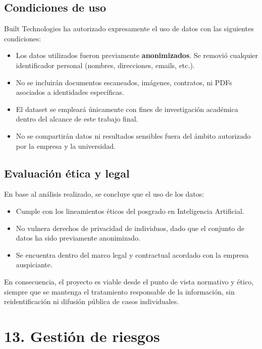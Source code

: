 \documentclass[
11pt, %
]{charter}
\begin{document}
\subsection*{Condiciones de uso}

Built Technologies ha autorizado expresamente el uso de datos con las siguientes condiciones:

\begin{itemize}
    \item Los datos utilizados fueron previamente \textbf{anonimizados}. Se removió cualquier identificador personal (nombres, direcciones, emails, etc.).
    \item No se incluirán documentos escaneados, imágenes, contratos, ni PDFs asociados a identidades específicas.
    \item El dataset se empleará únicamente con fines de investigación académica dentro del alcance de este trabajo final.
    \item No se compartirán datos ni resultados sensibles fuera del ámbito autorizado por la empresa y la universidad.
\end{itemize}

\subsection*{Evaluación ética y legal}

En base al análisis realizado, se concluye que el uso de los datos:

\begin{itemize}
    \item Cumple con los lineamientos éticos del posgrado en Inteligencia Artificial.
    \item No vulnera derechos de privacidad de individuos, dado que el conjunto de datos ha sido previamente anonimizado.
    \item Se encuentra dentro del marco legal y contractual acordado con la empresa auspiciante.
\end{itemize}

En consecuencia, el proyecto es viable desde el punto de vista normativo y ético, siempre que se mantenga el tratamiento responsable de la información, sin reidentificación ni difusión pública de casos individuales.

\section{13. Gestión de riesgos}
\label{sec:riesgos}
\end{document}
